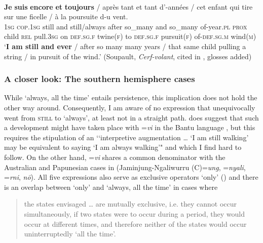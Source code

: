 \begin{exe}
	\ex {}\label{exAlwaysEncoreEtToujours}\\
	\gll \textbf{Je} \textbf{suis} \textbf{encore} \textbf{et} \textbf{toujours} / après tant et tant d’-années / cet enfant qui tire sur une ficelle / à la poursuite d-u vent.\\
	1\textsc{sg} \textsc{cop}.1\textsc{sg} still and still/always {} after so\_many and so\_many of-year.\textsc{pl} {} \textsc{prox} child \textsc{rel} pull.3\textsc{sg} on \textsc{def}.\textsc{sg}.\textsc{f} twine(\textsc{f}) {} to \textsc{def}.\textsc{sg}.\textsc{f} pursuit(\textsc{f}) of-\textsc{def}.\textsc{sg}.\textsc{m} wind(\textsc{m})\\
	\glt \lq \textbf{I am still and ever} / after so many many years / that same child pulling a
string / in pursuit of the wind.\rq{ }(Soupault, \textit{Cerf-volant}, cited in \cite[105]{MosegaardHansen2008}, glosses added)
\end{exe}

\subsubsection{A closer look: The southern hemisphere cases} 
While \lq always, all the time' entails persistence, this implication does not hold the other way around. Consequently, I am aware of no expression that unequivocally went from \textsc{still} to \lq always', at least not in a straight path. \textcite{Guerois2021} does suggest that such a development might have taken place with \mbox{=\textit{vi}} in the Bantu language , but this requires the stipulation of an \lq\lq interpretive augmentation … \lq I am still walking' may be equivalent to saying \lq I am always walking'" \parencite[166]{Guerois2021} and which I find hard to follow. On the other hand, \mbox{=\textit{vi}} shares a common denominator with the Australian and Papunesian cases in  (Jaminjung-Ngaliwurru \mbox{(C)=\textit{ung}},  \mbox{=\textit{nyali}},  \mbox{=\textit{rni}},  \textit{nō}). All five expressions also serve as exclusive operators \lq only\rq{ }() and there is an overlap between \lq only\rq{ }and \lq always, all the time\rq{ }in cases where

\begin{quote}
the states envisaged … are mutually exclusive, i.e. they cannot occur simultaneously, if two states were to occur during a period, they would occur at different times, and therefore neither of the states would occur uninterruptedly \lq all the time'. \parencite[28]{McConvell1983}
\end{quote}

